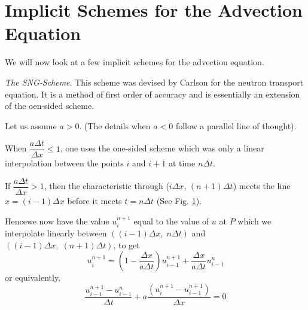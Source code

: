 \section{Implicit Schemes for the Advection
  Equation}\label{chap8:sec8.3}

We will now look at a few implicit schemes for the advection equation.

\begin{exam}\label{chap8:exam8.5}
{\em The SNG-Scheme}. This scheme was devised by Carlson for the
neutron transport equation. It is a method of first order of accuracy
and is essentially an extension of the oen-sided scheme. 

Let us assume $a>0$. (The details when $a <0$ follow a parallel line
of thought). 

When $\dfrac{a \Delta t}{\Delta x} \leq 1$, one uses the one-sided scheme which was only a linear interpolation between the points $i$ and $i+1$ at time $n \Delta t$. 

If $\dfrac{a\Delta t}{\Delta x} > 1$, then the characteristic through
($i\Delta x$, $(n+1)\Delta t$) meets the line $x = (i-1)\Delta x$
before it meets $t = n \Delta t$ (See Fig. \ref{c8:fig8.3}).  

\begin{figure}[H]
\caption{}\label{c8:fig8.3}
\end{figure}

Hence\pageoriginale we now have the value  $u^{n+1}_i$ equal to the
value of $u$ at $P$ which we interpolate linearly between $((i-1)
\Delta x, \; n \Delta t)$ and $((i-1)\Delta x, \; (n+1)\Delta t)$, to
get 
$$
u^{n+1}_i = (1 - \frac{\Delta x}{a \Delta t}) u^{n+1}_{i-1} +
\frac{\Delta x}{a\Delta t} u^n_{i-1} 
$$
or equivalently,
\begin{equation*}
\frac{u^{n+1}_{i-1} - u^n_{i-1}}{\Delta t} + a \frac{(u^{n+1}_i -
  u^{n+1}_{i-1})}{\Delta x}  = 0\tag{8.15}\label{eq8.15} 
\end{equation*}


\end{exam}
